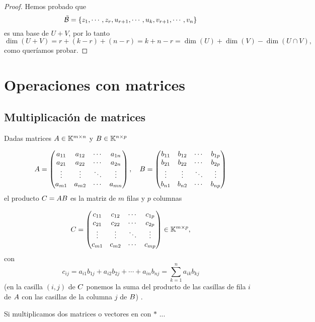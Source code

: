 \begin{proof}
  Hemos probado que
  $$\tilde{\B}=\{\zb_1,\cdots,\zb_r,\ub_{r+1},\cdots, \ub_k, \vb_{r+1},\cdots, \vb_n\}$$
  es una base de $U+V$, por lo tanto
  $$\dim(U+V)=r+(k-r)+(n-r)=k+n-r=\dim(U)+\dim(V)-\dim(U\cap V),$$
  como queríamos probar. \end{proof} 
  
  
\section{Operaciones con matrices}

\subsection{Multiplicación de matrices}

Dadas matrices $A \in \mathbb K^{m \times n}$ y $B \in \mathbb K^{n \times p}$

$$
\Ab =\begin{pmatrix}a_{11}&a_{12}&\cdots &a_{1n}\\a_{21}&a_{22}&\cdots &a_{2n}\\\vdots &\vdots &\ddots &\vdots \\a_{m1}&a_{m2}&\cdots &a_{mn}\\\end{pmatrix},\quad  {\Bb} ={\begin{pmatrix}b_{11}&b_{12}&\cdots &b_{1p}\\b_{21}&b_{22}&\cdots &b_{2p}\\\vdots &\vdots &\ddots &\vdots \\b_{n1}&b_{n2}&\cdots &b_{np}\\\end{pmatrix}}
$$ el producto $\Cb = \Ab\Bb$ es la matriz de $m$ filas y $p$ columnas

$$
\Cb =\begin{pmatrix}c_{11}&c_{12}&\cdots &c_{1p}\\c_{21}&c_{22}&\cdots &c_{2p}\\\vdots &\vdots &\ddots &\vdots \\c_{m1}&c_{m2}&\cdots &c_{mp}\\\end{pmatrix} \in \K^{m \times p},
$$
con
$$
c_{ij}=a_{i1}b_{1j}+a_{i2}b_{2j}+\cdots +a_{in}b_{nj}=\sum _{k=1}^{n}a_{ik}b_{kj}
$$
(en la casilla $(i,j)$ de $\Cb$ ponemos la suma del producto de las casillas de fila $i$ de $\Ab$ con las casillas de la columna $j$ de $\Bb$) .


Si multiplicamos dos matrices o vectores en \python con $*$ ...


